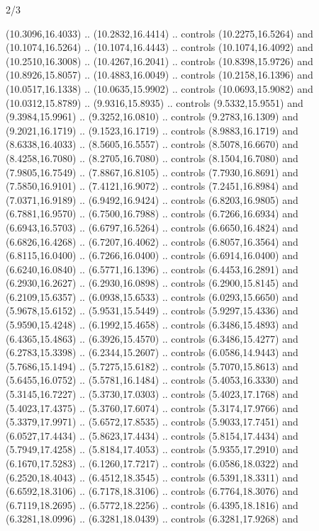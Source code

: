 \begin{flagdescription}{2/3}
\begin{scope}[yshift=\flagwidth,scale=\flagwidth/1241.93737]
\begin{scope}[y=-1mm, x=1mm,draw=gold,fill=blue,line join=miter,miter limit=4,line width=1.8\lw]
{  (10.3096,16.4033) .. (10.2832,16.4414) .. controls (10.2275,16.5264) and
  (10.1074,16.5264) .. (10.1074,16.4443) .. controls (10.1074,16.4092) and
  (10.2510,16.3008) .. (10.4267,16.2041) .. controls (10.8398,15.9726) and
  (10.8926,15.8057) .. (10.4883,16.0049) .. controls (10.2158,16.1396) and
  (10.0517,16.1338) .. (10.0635,15.9902) .. controls (10.0693,15.9082) and
  (10.0312,15.8789) .. (9.9316,15.8935) .. controls (9.5332,15.9551) and
  (9.3984,15.9961) .. (9.3252,16.0810) .. controls (9.2783,16.1309) and
  (9.2021,16.1719) .. (9.1523,16.1719) .. controls (8.9883,16.1719) and
  (8.6338,16.4033) .. (8.5605,16.5557) .. controls (8.5078,16.6670) and
  (8.4258,16.7080) .. (8.2705,16.7080) .. controls (8.1504,16.7080) and
  (7.9805,16.7549) .. (7.8867,16.8105) .. controls (7.7930,16.8691) and
  (7.5850,16.9101) .. (7.4121,16.9072) .. controls (7.2451,16.8984) and
  (7.0371,16.9189) .. (6.9492,16.9424) .. controls (6.8203,16.9805) and
  (6.7881,16.9570) .. (6.7500,16.7988) .. controls (6.7266,16.6934) and
  (6.6943,16.5703) .. (6.6797,16.5264) .. controls (6.6650,16.4824) and
  (6.6826,16.4268) .. (6.7207,16.4062) .. controls (6.8057,16.3564) and
  (6.8115,16.0400) .. (6.7266,16.0400) .. controls (6.6914,16.0400) and
  (6.6240,16.0840) .. (6.5771,16.1396) .. controls (6.4453,16.2891) and
  (6.2930,16.2627) .. (6.2930,16.0898) .. controls (6.2900,15.8145) and
  (6.2109,15.6357) .. (6.0938,15.6533) .. controls (6.0293,15.6650) and
  (5.9678,15.6152) .. (5.9531,15.5449) .. controls (5.9297,15.4336) and
  (5.9590,15.4248) .. (6.1992,15.4658) .. controls (6.3486,15.4893) and
  (6.4365,15.4863) .. (6.3926,15.4570) .. controls (6.3486,15.4277) and
  (6.2783,15.3398) .. (6.2344,15.2607) .. controls (6.0586,14.9443) and
  (5.7686,15.1494) .. (5.7275,15.6182) .. controls (5.7070,15.8613) and
  (5.6455,16.0752) .. (5.5781,16.1484) .. controls (5.4053,16.3330) and
  (5.3145,16.7227) .. (5.3730,17.0303) .. controls (5.4023,17.1768) and
  (5.4023,17.4375) .. (5.3760,17.6074) .. controls (5.3174,17.9766) and
  (5.3379,17.9971) .. (5.6572,17.8535) .. controls (5.9033,17.7451) and
  (6.0527,17.4434) .. (5.8623,17.4434) .. controls (5.8154,17.4434) and
  (5.7949,17.4258) .. (5.8184,17.4053) .. controls (5.9355,17.2910) and
  (6.1670,17.5283) .. (6.1260,17.7217) .. controls (6.0586,18.0322) and
  (6.2520,18.4043) .. (6.4512,18.3545) .. controls (6.5391,18.3311) and
  (6.6592,18.3106) .. (6.7178,18.3106) .. controls (6.7764,18.3076) and
  (6.7119,18.2695) .. (6.5772,18.2256) .. controls (6.4395,18.1816) and
  (6.3281,18.0996) .. (6.3281,18.0439) .. controls (6.3281,17.9268) and
}
\end{scope}
\end{scope}
\end{flagdescription}
